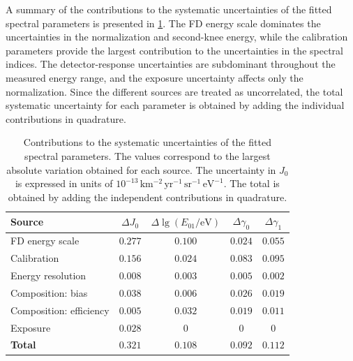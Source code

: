 \documentclass[main.tex]{subfiles}
\begin{document}
A summary of the contributions to the systematic uncertainties of the fitted spectral parameters is presented in \cref{table:sd433_parameter_systematics}.
The FD energy scale dominates the uncertainties in the normalization and second-knee energy, while the calibration parameters provide the largest contribution to the uncertainties in the spectral indices.
The detector-response uncertainties are subdominant throughout the measured energy range, and the exposure uncertainty affects only the normalization.
Since the different sources are treated as uncorrelated, the total systematic uncertainty for each parameter is obtained by adding the individual contributions in quadrature.

\begin{table}
    \centering
    \caption{Contributions to the systematic uncertainties of the fitted  spectral parameters. The values correspond to the largest absolute variation obtained for each source. The uncertainty in $J_0$ is expressed in units of $10^{-13}\,\mathrm{km^{-2}\,yr^{-1}\,sr^{-1}\,eV^{-1}}$. The total is obtained by adding the independent contributions in quadrature.}
    \label{table:sd433_parameter_systematics}
    \begin{tabular}{lcccc}
        \hline
        Source
        & $\Delta J_0$
        & $\Delta\lg(E_{01}/\mathrm{eV})$
        & $\Delta\gamma_0$
        & $\Delta\gamma_1$ \\
        \hline
        FD energy scale
        & $0.277$ & $0.100$ & $0.024$ & $0.055$ \\
        Calibration
        & $0.156$ & $0.024$ & $0.083$ & $0.095$ \\
        Energy resolution
        & $0.008$ & $0.003$ & $0.005$ & $0.002$ \\
        Composition: bias
        & $0.038$ & $0.006$ & $0.026$ & $0.019$ \\
        Composition: efficiency
        & $0.005$ & $0.032$ & $0.019$ & $0.011$ \\
        Exposure
        & $0.028$ & $0$ & $0$ & $0$ \\
        \hline
        \textbf{Total}
        & $\mathbf{0.321}$
        & $\mathbf{0.108}$
        & $\mathbf{0.092}$
        & $\mathbf{0.112}$ \\
        \hline
    \end{tabular}
\end{table}
\end{document}
